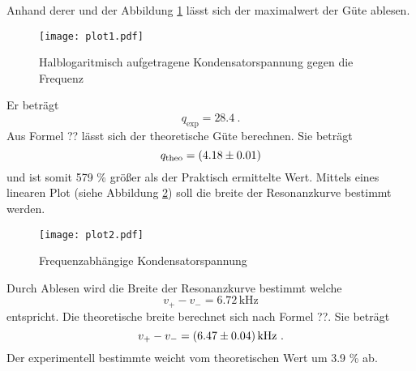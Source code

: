 Anhand derer und der Abbildung \ref{fig:logUc} lässt sich der maximalwert der Güte ablesen. 
\begin{figure}
  \centering
  \texttt{[image: plot1.pdf]}
  \caption{Halblogaritmisch aufgetragene Kondensatorspannung gegen die Frequenz}
  \label{fig:logUc}
\end{figure}
Er beträgt
\begin{equation}
  q_\text{exp} = 28.4 \ .
  \label{eqn:qexp}
\end{equation}
Aus Formel ?? lässt sich der theoretische Güte berechnen. Sie beträgt 
\begin{equation}
  q_\text{theo} = (\num{4.18 +- 0.01})
  \label{eqn:qtheo}
\end{equation} 
und ist somit 579 \% größer als der Praktisch ermittelte Wert. Mittels eines linearen Plot (siehe Abbildung \ref{fig:fUc}) soll die breite der Resonanzkurve bestimmt werden.
\begin{figure}
  \centering
  \texttt{[image: plot2.pdf]}
  \caption{Frequenzabhängige Kondensatorspannung}
  \label{fig:fUc}
\end{figure}
Durch Ablesen wird die Breite der Resonanzkurve bestimmt welche 
\begin{equation}
  v_+ - v_- = 6.72 \, \text{kHz} 
\end{equation}
entspricht. Die theoretische breite berechnet sich nach Formel ??. Sie beträgt
\begin{equation}
v_+ - v_- = (\num{6.47 +- 0.04}) \, \text{kHz} \ .
\end{equation}
Der experimentell bestimmte weicht vom theoretischen Wert um 3.9 \% ab.
